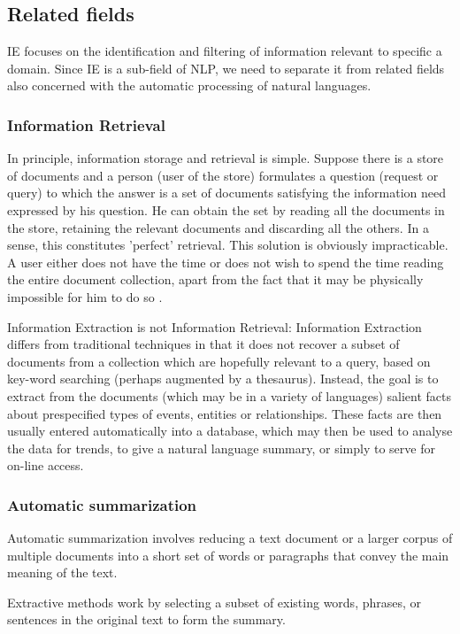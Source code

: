 \subsection{Related fields}
\gls{IE} focuses on the identification and filtering of information relevant to specific a domain. Since \gls{IE} is a sub-field of \gls{NLP}, we need to separate it from related fields also concerned with the automatic processing of natural languages.

\subsubsection{Information Retrieval}
In principle, information storage and retrieval is simple. Suppose there is a store of documents and a person (user of the store) formulates a question (request or query) to which the answer is a set of documents satisfying the information need expressed by his question. He can obtain the set by reading all the documents in the store, retaining the relevant documents and discarding all the others. In a sense, this constitutes 'perfect' retrieval. This solution is obviously impracticable. A user either does not have the time or does not wish to spend the time reading the entire document collection, apart from the fact that it may be physically impossible for him to do so \cite{Rijsbergen:1979}.

Information Extraction is not Information Retrieval: Information Extraction differs from traditional techniques in that it does not recover a subset of documents from a collection which are hopefully relevant to a query, based on key-word searching (perhaps augmented by a thesaurus). Instead, the goal is to extract from the documents (which may be in a variety of languages) salient facts about prespecified types of events, entities or relationships. These facts are then usually entered automatically into a database, which may then be used to analyse the data for trends, to give a natural language summary, or simply to serve for on-line access. \cite{GATE:IE}

\subsubsection{Automatic summarization}
Automatic summarization involves reducing a text document or a larger corpus of multiple documents into a short set of words or paragraphs that convey the main meaning of the text.

Extractive methods work by selecting a subset of existing words, phrases, or sentences in the original text to form the summary.

